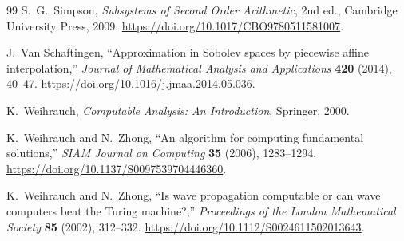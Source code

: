 \documentclass[11pt]{article}
\theoremstyle{definition}
\theoremstyle{remark}
\begin{document}
\begin{thebibliography}{99}
S.~G.~Simpson,
\emph{Subsystems of Second Order Arithmetic}, 2nd ed., Cambridge University
Press, 2009.
\url{https://doi.org/10.1017/CBO9780511581007}.

J.~Van Schaftingen,
``Approximation in Sobolev spaces by piecewise affine interpolation,''
\emph{Journal of Mathematical Analysis and Applications} \textbf{420}
(2014), 40--47.
\url{https://doi.org/10.1016/j.jmaa.2014.05.036}.

K.~Weihrauch,
\emph{Computable Analysis: An Introduction}, Springer, 2000.

K.~Weihrauch and N.~Zhong,
``An algorithm for computing fundamental solutions,''
\emph{SIAM Journal on Computing} \textbf{35} (2006), 1283--1294.
\url{https://doi.org/10.1137/S0097539704446360}.

K.~Weihrauch and N.~Zhong,
``Is wave propagation computable or can wave computers beat the Turing
machine?,''
\emph{Proceedings of the London Mathematical Society} \textbf{85} (2002),
312--332.
\url{https://doi.org/10.1112/S0024611502013643}.

\end{thebibliography}
\end{document}
